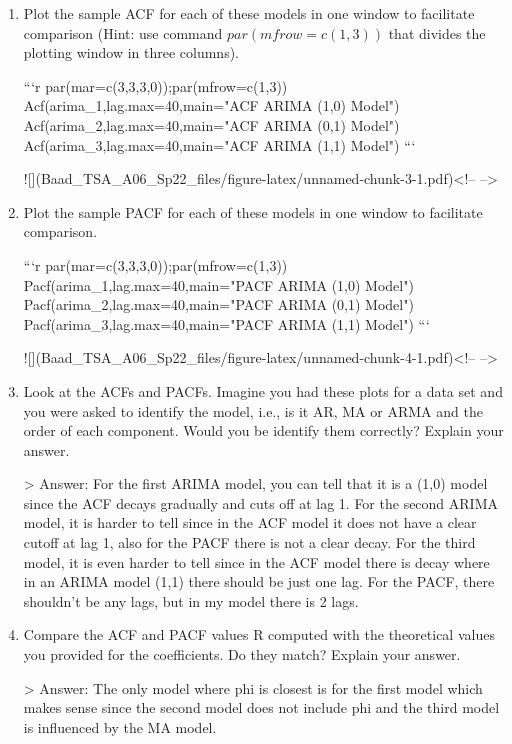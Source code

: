 \documentclass[
]{article}
\begin{document}
\begin{enumerate}[label=(\alph*)]

\item Plot the sample ACF for each of these models in one window to facilitate comparison (Hint: use command $par(mfrow=c(1,3))$ that divides the plotting window in three columns).  


```r
par(mar=c(3,3,3,0));par(mfrow=c(1,3))
Acf(arima_1,lag.max=40,main="ACF ARIMA (1,0) Model")
Acf(arima_2,lag.max=40,main="ACF ARIMA (0,1) Model")
Acf(arima_3,lag.max=40,main="ACF ARIMA (1,1) Model")
```

![](Baad_TSA_A06_Sp22_files/figure-latex/unnamed-chunk-3-1.pdf)<!-- --> 


\item Plot the sample PACF for each of these models in one window to facilitate comparison.  


```r
par(mar=c(3,3,3,0));par(mfrow=c(1,3))
Pacf(arima_1,lag.max=40,main="PACF ARIMA (1,0) Model")
Pacf(arima_2,lag.max=40,main="PACF ARIMA (0,1) Model")
Pacf(arima_3,lag.max=40,main="PACF ARIMA (1,1) Model")
```

![](Baad_TSA_A06_Sp22_files/figure-latex/unnamed-chunk-4-1.pdf)<!-- --> 

\item Look at the ACFs and PACFs. Imagine you had these plots for a data set and you were asked to identify the model, i.e., is it AR, MA or ARMA and the order of each component. Would you be identify them correctly? Explain your answer.

> Answer: For the first ARIMA model, you can tell that it is a (1,0) model since the ACF decays gradually and cuts off at lag 1. For the second ARIMA model, it is harder to tell since in the ACF model it does not have a clear cutoff at lag 1, also for the PACF there is not a clear decay. For the third model, it is even harder to tell since in the ACF model there is decay where in an ARIMA model (1,1) there should be just one lag. For the PACF, there shouldn't be any lags, but in my model there is 2 lags.

\item Compare the ACF and PACF values R computed with the theoretical values you provided for the coefficients. Do they match? Explain your answer.

> Answer: The only model where phi is closest is for the first model which makes sense since the second model does not include phi and the third model is influenced by the MA model.



\end{enumerate}
\end{document}
